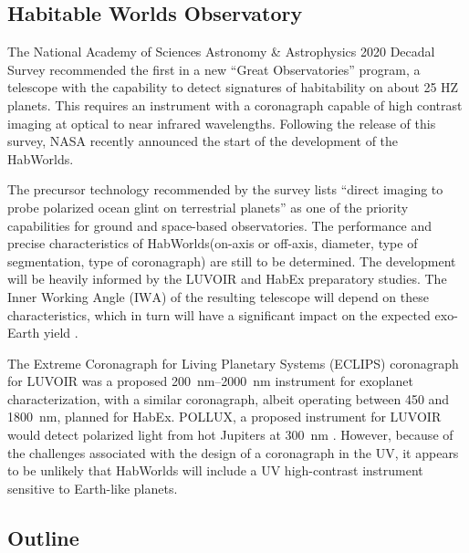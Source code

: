 \documentclass[usenatbib]{mnras}
\newcommand{\IWA}{\ensuremath{\mathrm{IWA}}\xspace}
\newcommand{\HWO}{HabWorlds\xspace}
\begin{document}
\subsection{Habitable Worlds Observatory}

The National Academy of Sciences Astronomy \& Astrophysics 2020 Decadal Survey \citep{decadal} recommended the first in a new \enquote{Great Observatories} program, a telescope with the capability to detect signatures of habitability on about 25 HZ planets.
This requires an instrument with a coronagraph capable of high contrast imaging at optical to near infrared wavelengths.
Following the release of this survey, NASA recently announced the start of the development of the \HWO.

The precursor technology recommended by the survey lists \enquote{direct imaging to probe polarized ocean glint on terrestrial planets} as one of the priority capabilities \citep[Box E.1 in][]{decadal} for ground and space-based observatories.
%
The performance and precise characteristics of \HWO (on-axis or off-axis, diameter, type of segmentation, type of coronagraph) are still to be determined.
%
The development will be heavily informed by the LUVOIR \citep{LUVOIR2019} and HabEx \citep{HabEx_2020} preparatory studies.
%
The Inner Working Angle (\IWA) of the resulting telescope will depend on these characteristics, which in turn will have a significant impact on the expected exo-Earth yield \citep{Stark2019_exoplanetyield}.

The Extreme Coronagraph for Living Planetary Systems (ECLIPS) coronagraph for LUVOIR was a proposed \qtyrange{200}{2000}{\nano\meter} instrument for exoplanet characterization, with a similar coronagraph, albeit operating between \num{450} and \qty{1800}{\nano\meter}, planned for HabEx.
%
POLLUX, a proposed instrument for LUVOIR would detect polarized light from hot Jupiters at \qty{300}{\nano\meter} \citep{Bouret2018_pollux}.
%
However, because of the challenges associated with the design of a coronagraph in the UV, it appears to be unlikely that \HWO will include a UV high-contrast instrument sensitive to Earth-like planets.


\subsection{Outline}
\end{document}
